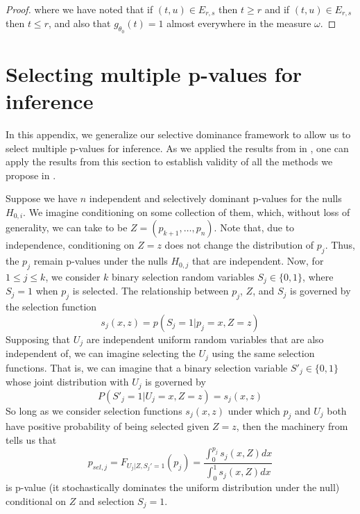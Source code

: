 \documentclass{article}
\begin{document}
\begin{appendix}
\begin{proof}
    where we have noted that if $(t, u) \in E_{r, s}$ then $t \geq r$ and if $(t, u) \in E_{r, s}$ then $t \leq r$, and also that $g_{\theta_0}(t) = 1$ almost everywhere in the measure $\omega$.  
\end{proof}

\section{Selecting multiple p-values for inference}
\label{sec:multiple_p_vals_appdx}
\iffalse 
In this appendix, we generalize our selective dominance framework to allow us to select multiple p-values for inference. As we applied the results from  in , one can apply the results from this section to establish validity of all the methods we propose in . 

Suppose we have $n$ independent and selectively dominant p-values for the nulls $H_{0, i}$. We imagine conditioning on some collection of them, which, without loss of generality, we can take to be $Z = (p_{k+1}, \dots, p_n)$. Note that, due to independence, conditioning on $Z = z$ does not change the distribution of $p_j$. Thus, the $p_j$ remain p-values under the nulls $H_{0, j}$ that are independent. Now, for $1 \leq j \leq k$, we consider $k$ binary selection random variables $S_j \in \{0, 1\}$, where $S_j = 1$ when $p_j$ is selected. The relationship between $p_j$, $Z$, and $S_j$ is governed by the selection function 
\begin{equation*}
    s_j(x, z) = p(S_j = 1 | p_j = x, Z=z)
\end{equation*} 
Supposing that $U_j$ are independent uniform random variables that are also independent of, we can imagine selecting the $U_j$ using the same selection functions. That is, we can imagine that a binary selection variable $S'_j \in \{0, 1\}$ whose joint distribution with $U_j$ is governed by 
\begin{equation*}
    P(S'_j = 1| U_j = x, Z = z) = s_j(x, z)
\end{equation*}
So long as we consider selection functions $s_j(x, z)$ under which $p_j$ and $U_j$ both have positive probability of being selected given $Z=z$, then the machinery from  tells us that 
\begin{equation*}
    p_{sel, j} = F_{U_j |Z, S_j' = 1}(p_j) = \frac{\int_0^{p_j} s_j(x, Z)dx }{\int_0^1 s_j(x, Z)dx}
\end{equation*}
is p-value (it stochastically dominates the uniform distribution under the null) conditional on $Z$ and selection $S_j = 1$. 


\end{appendix}
\end{document}
